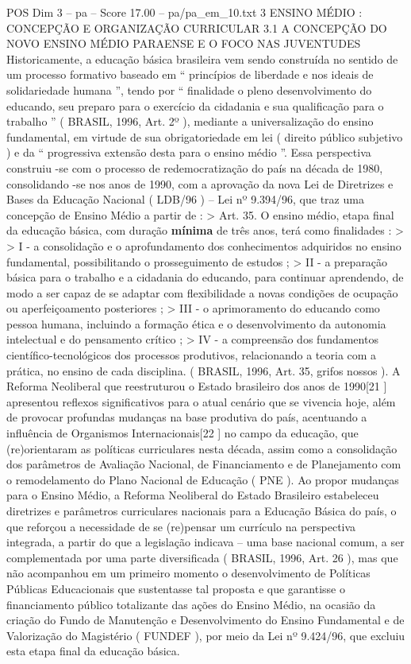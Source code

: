 \begin{textsample}{POS Dim 3 – pa – Score 17.00 – pa/pa\_em\_10.txt}  \label{ex:f3_pos_233}
3 ENSINO MÉDIO : CONCEPÇÃO E ORGANIZAÇÃO CURRICULAR 3.1 A CONCEPÇÃO DO NOVO ENSINO MÉDIO PARAENSE E O FOCO NAS JUVENTUDES Historicamente, a educação básica brasileira vem sendo construída no sentido de um processo formativo baseado em “ princípios de liberdade e nos ideais de solidariedade humana ”, tendo por “ finalidade o pleno desenvolvimento do educando, seu preparo para o exercício da cidadania e sua qualificação para o trabalho ” ( BRASIL, 1996, Art. 2º ), mediante a universalização do ensino fundamental, em virtude de sua obrigatoriedade em lei ( direito público subjetivo ) e da “ progressiva extensão desta para o ensino médio ”.
Essa perspectiva construiu -se com o processo de redemocratização do país na década de 1980, consolidando -se nos anos de 1990, com a aprovação da nova Lei de Diretrizes e Bases da Educação Nacional ( LDB/96 ) – Lei nº 9.394/96, que traz uma concepção de Ensino Médio a partir de : > Art. 35.
O ensino médio, etapa final da educação básica, com duração \textbf{mínima} de três anos, terá como finalidades : > > I - a consolidação e o aprofundamento dos conhecimentos adquiridos no ensino fundamental, possibilitando o prosseguimento de estudos ; > II - a preparação básica para o trabalho e a cidadania do educando, para continuar aprendendo, de modo a ser capaz de se adaptar com flexibilidade a novas condições de ocupação ou aperfeiçoamento posteriores ; > III - o aprimoramento do educando como pessoa humana, incluindo a formação ética e o desenvolvimento da autonomia intelectual e do pensamento crítico ; > IV - a compreensão dos fundamentos científico-tecnológicos dos processos produtivos, relacionando a teoria com a prática, no ensino de cada disciplina. ( BRASIL, 1996, Art. 35, grifos nossos ).
A Reforma Neoliberal que reestruturou o Estado brasileiro dos anos de 1990[21 ] apresentou reflexos significativos para o atual cenário que se vivencia hoje, além de provocar profundas mudanças na base produtiva do país, acentuando a influência de Organismos Internacionais[22 ] no campo da educação, que (re)orientaram as políticas curriculares nesta década, assim como a consolidação dos parâmetros de Avaliação Nacional, de Financiamento e de Planejamento com o remodelamento do Plano Nacional de Educação ( PNE ).
Ao propor mudanças para o Ensino Médio, a Reforma Neoliberal do Estado Brasileiro estabeleceu diretrizes e parâmetros curriculares nacionais para a Educação Básica do país, o que reforçou a necessidade de se (re)pensar um currículo na perspectiva integrada, a partir do que a legislação indicava – uma base nacional comum, a ser complementada por uma parte diversificada ( BRASIL, 1996, Art. 26 ), mas que não acompanhou em um primeiro momento o desenvolvimento de Políticas Públicas Educacionais que sustentasse tal proposta e que garantisse o financiamento público totalizante das ações do Ensino Médio, na ocasião da criação do Fundo de Manutenção e Desenvolvimento do Ensino Fundamental e de Valorização do Magistério ( FUNDEF ), por meio da Lei nº 9.424/96, que excluiu esta etapa final da educação básica.

\end{textsample}
